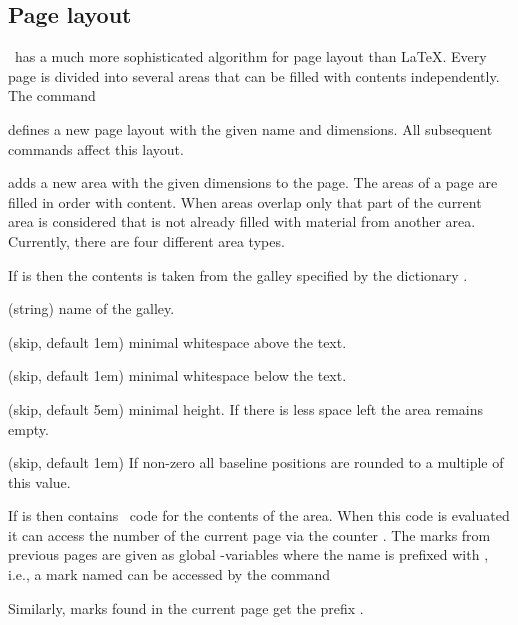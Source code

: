 \subsection{Page layout}   %


\ant\ has a much more sophisticated algorithm for page layout than \LaTeX.
Every page is divided into several areas that can be filled with contents independently.
The command

\begin{code}
\cs{\newpagelayout}   
\end{code}
defines a new page layout with the given name and dimensions.
All subsequent \cs{\newpagearea} commands affect this layout.

\begin{code}
\cs{\newpagearea}     
  
\end{code}
adds a new area with the given dimensions to the page.
The areas of a page are filled in order with content.
When areas overlap only that part of the current area is considered
that is not already filled with material from another area.
Currently, there are four different area types.

If  is 
then the contents is taken from the galley specified by the dictionary .
\begin{longdescription}
\item{\quad (string)}
  name of the galley.
\item{\quad (skip, default 1em)}
  minimal whitespace above the text.
\item{\quad (skip, default 1em)}
  minimal whitespace below the text.
\item{\quad (skip, default 5em)}
  minimal height. If there is less space left the area remains empty.
\item{\quad (skip, default 1em)}
  If non-zero all baseline positions are rounded to a multiple of this value.
\end{longdescription}

If  is  then  contains \ant\ code for the contents of the area.
When this code is evaluated it can access the number of the current page via the counter .
The marks from previous pages are given as global \AL-variables where the name is prefixed with ,
i.e., a mark named  can be accessed by the command
\begin{code}
  \blue


  \quad{}

  \quad{}

\end{code}
Similarly, marks found in the current page get the prefix .

